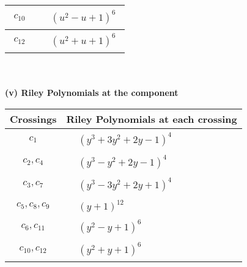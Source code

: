 \documentclass[1p]{elsarticle_modified}
\theoremstyle{definition}
\begin{document}
\begin{tabular}{m{50pt}|m{274pt}}
\hline $$\begin{aligned}c_{10}\end{aligned}$$&$\begin{aligned}
&(u^2- u+1)^6
\end{aligned}$\\
\hline $$\begin{aligned}c_{12}\end{aligned}$$&$\begin{aligned}
&(u^2+u+1)^6
\end{aligned}$\\
\hline
\end{tabular}\\~\\
\newpage\renewcommand{\arraystretch}{1}
\flushleft \textbf{(v) Riley Polynomials at the component}\newline \\
\begin{tabular}{m{50pt}|m{274pt}}
Crossings & \hspace{64pt}Riley Polynomials at each crossing \\
\hline $$\begin{aligned}c_{1}\end{aligned}$$&$\begin{aligned}
&(y^3+3 y^2+2 y-1)^4
\end{aligned}$\\
\hline $$\begin{aligned}c_{2},c_{4}\end{aligned}$$&$\begin{aligned}
&(y^3- y^2+2 y-1)^4
\end{aligned}$\\
\hline $$\begin{aligned}c_{3},c_{7}\end{aligned}$$&$\begin{aligned}
&(y^3-3 y^2+2 y+1)^4
\end{aligned}$\\
\hline $$\begin{aligned}c_{5},c_{8},c_{9}\end{aligned}$$&$\begin{aligned}
&(y+1)^{12}
\end{aligned}$\\
\hline $$\begin{aligned}c_{6},c_{11}\end{aligned}$$&$\begin{aligned}
&(y^2- y+1)^6
\end{aligned}$\\
\hline $$\begin{aligned}c_{10},c_{12}\end{aligned}$$&$\begin{aligned}
&(y^2+y+1)^6
\end{aligned}$\\
\hline
\end{tabular}\\~\\
\end{document}

